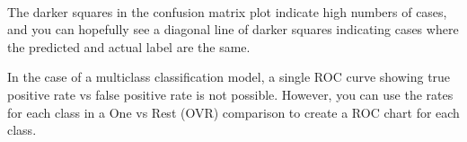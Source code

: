 \documentclass[11pt]{article}
\begin{document}
    \begin{center}
    \end{center}
    { \hspace*{\fill} \\}
    
    The darker squares in the confusion matrix plot indicate high numbers of
cases, and you can hopefully see a diagonal line of darker squares
indicating cases where the predicted and actual label are the same.

In the case of a multiclass classification model, a single ROC curve
showing true positive rate vs false positive rate is not possible.
However, you can use the rates for each class in a One vs Rest (OVR)
comparison to create a ROC chart for each class.
\end{document}
